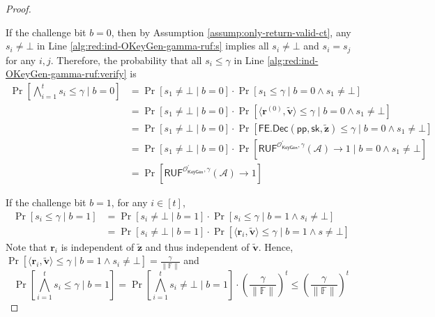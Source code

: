\begin{proof}
\begin{figure}[h]
\end{figure}


If the challenge bit $b = 0$, then by Assumption \ref{assump:only-return-valid-ct}, any $s_i \neq \bot$ in Line \ref{alg:red:ind-OKeyGen-gamma-ruf:s} implies all $s_i \neq \bot$ and $s_i = s_j$ for any $i, j$. Therefore, the probability that all $s_i \leq \gamma$ in Line \ref{alg:red:ind-OKeyGen-gamma-ruf:verify} is
\begin{align*}
	\Pr\left[ \bigwedge_{i=1}^t s_i \leq \gamma \mid b = 0 \right]
	&= \Pr\left[ s_1 \neq \bot \mid b = 0 \right] \cdot \Pr \left[ s_1 \leq \gamma \mid b = 0 \wedge s_1 \neq \bot \right] \\
	&= \Pr \left[ s_1 \neq \bot \mid b = 0 \right] \cdot \Pr \left[ \langle \mathbf{r}^{(0)}, \mathbf{\tilde{v}} \rangle \leq \gamma \mid b = 0 \wedge s_1 \neq \bot \right] \\
	&= \Pr \left[s_1 \neq \bot \mid b = 0 \right] \cdot \Pr \left[ \textsf{FE.Dec}(\textsf{pp}, \textsf{sk}, \mathbf{\tilde{z}}) \leq \gamma \mid b = 0 \wedge s_1 \neq \bot \right] \\
	&= \Pr \left[s_1 \neq \bot \mid b = 0 \right] \cdot \Pr \left[ \textsf{RUF}^{\mathcal{O}^\prime_{\textsf{KeyGen}}, \gamma}(\mathcal{A}) \to 1 \mid b = 0 \wedge s_1 \neq \bot \right] \\ 
	&= \Pr \left[ \textsf{RUF}^{\mathcal{O}^\prime_{\textsf{KeyGen}}, \gamma}(\mathcal{A}) \to 1 \right] 
\end{align*}

If the challenge bit $b = 1$, for any $i \in [t]$,
\begin{align*}
	\Pr[ s_i \leq \gamma \mid b = 1 ]
	&= \Pr[s_i \neq \bot \mid b = 1] \cdot \Pr[ s_i \leq \gamma \mid b = 1 \wedge s_i \neq \bot] \\
	&= \Pr[s_i \neq \bot \mid b = 1] \cdot \Pr[ \langle \mathbf{r}_i, \mathbf{\tilde{v}} \rangle \leq \gamma \mid b = 1 \wedge s \neq \bot]
\end{align*}
Note that $\mathbf{r}_i$ is independent of $\mathbf{\tilde{z}}$ and thus independent of $\mathbf{\tilde{v}}$. Hence, $\Pr[ \langle \mathbf{r}_i, \mathbf{\tilde{v}} \rangle \leq \gamma \mid b = 1 \wedge s_i \neq \bot] = \frac{\gamma}{\| \mathbb{F} \|}$ and
\[
	\Pr \left[ \bigwedge_{i=1}^t s_i \leq \gamma \mid b = 1 \right] = \Pr \left[ \bigwedge_{i=1}^t s_i \neq \bot \mid b = 1 \right] \cdot \left( \frac{\gamma}{\| \mathbb{F} \|} \right)^t \leq \left( \frac{\gamma}{\| \mathbb{F} \|} \right)^t
\]


\end{proof}
